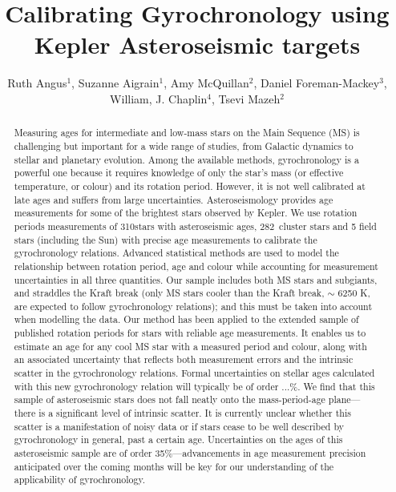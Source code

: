 \documentclass[10pt,preprint]{aastex}
\newcommand{\nastero}{310}
\newcommand{\ncluster}{282~}
\begin{document}
\title{Calibrating Gyrochronology using Kepler Asteroseismic targets}

\author{Ruth Angus$^1$, Suzanne Aigrain$^1$, Amy McQuillan$^2$, Daniel Foreman-Mackey$^3$,  William, J. Chaplin$^4$, Tsevi Mazeh$^2$}

\begin{abstract}
\label{abs}

Measuring ages for intermediate and low-mass stars on the Main Sequence (MS) is challenging but important for a wide range of studies, from Galactic dynamics to stellar and planetary evolution.
Among the available methods, gyrochronology is a powerful one because it requires knowledge of only the star's mass (or effective temperature, or colour) and its rotation period.
However, it is not well calibrated at late ages and suffers from large uncertainties.
Asteroseismology provides age measurements for some of the brightest stars observed by Kepler.
We use rotation periods measurements of \nastero stars with asteroseismic ages, \ncluster cluster stars and 5 field stars (including the Sun) with precise age measurements to calibrate the gyrochronology relations.
Advanced statistical methods are used to model the relationship between rotation period, age and colour while accounting for measurement uncertainties in all three quantities.
Our sample includes both MS stars and subgiants, and straddles the Kraft break (only MS stars cooler than the Kraft break, $\sim$ 6250 K, are expected to follow gyrochronology relations); and this must be taken into account when modelling the data.
Our method has been applied to the extended sample of published rotation periods for stars with reliable age measurements.
It enables us to estimate an age for any cool MS star with a measured period and colour, along with an associated uncertainty that reflects both measurement errors and the intrinsic scatter in the gyrochronology relations.
Formal uncertainties on stellar ages calculated with this new gyrochronology relation will typically be of order ...\%.
We find that this sample of asteroseismic stars does not fall neatly onto the mass-period-age plane---there is a significant level of intrinsic scatter.
It is currently unclear whether this scatter is a manifestation of noisy data or if stars cease to be well described by gyrochronology in general, past a certain age.
Uncertainties on the ages of this asteroseismic sample are of order 35\%---advancements in age measurement precision anticipated over the coming months will be key for our understanding of the applicability of gyrochronology.

\end{abstract}
\end{document}
